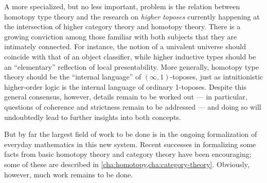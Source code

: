 A more specialized, but no less important, problem is the relation between homotopy type theory and the research  on \emph{higher toposes} currently happening at the intersection of higher category theory and homotopy theory.
There is a growing conviction among those familiar with both subjects that they are intimately connected.
For instance, the notion of a univalent universe should coincide with that of an object classifier, while higher inductive types should be an ``elementary'' reflection of local presentability.
More generally, homotopy type theory should be the ``internal language'' of $(\infty,1)$-toposes, just as intuitionistic higher-order logic is the internal language of ordinary 1-toposes.
Despite this general consensus, however, details remain to be worked out --- in particular, questions of coherence and strictness remain to be addressed  --- and doing so will undoubtedly lead to further insights into both concepts.

But by far the largest field of work to be done is in the ongoing formalization of everyday mathematics in this new system.
Recent successes in formalizing some facts from basic homotopy theory and category theory have been encouraging; some of these are described in \cref{cha:homotopy,cha:category-theory}.
Obviously, however, much work remains to be done.

%


